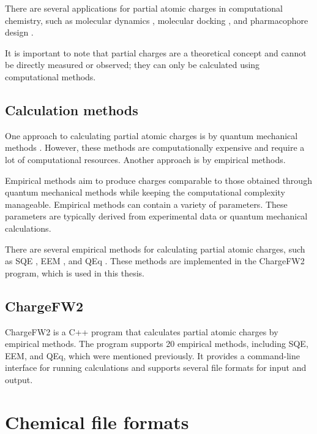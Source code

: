 \documentclass[
  digital,     %
  oneside,     %
  nosansbold,  %
  nocolorbold, %
  lof,         %
  lot,         %
]{fithesis4}
\begin{document}

There are several applications for partial atomic charges in computational chemistry, such as molecular dynamics \cite{nejad2018insulin}, molecular docking \cite{docking}, and pharmacophore design \cite{stalke2011meaningful}. \cite{racek2022thesis,schindler2021thesis}

It is important to note that partial charges are a theoretical concept and cannot be directly measured or observed; they can only be calculated using computational methods. \cite{schindler2019thesis} 

\subsection{Calculation methods}
\label{section:calculating_partial_atomic_charges}

One approach to calculating partial atomic charges is by quantum mechanical methods \cite{gupta2015principles}. However, these methods are computationally expensive and require a lot of computational resources. Another approach is by empirical methods.

Empirical methods aim to produce charges comparable to those obtained through quantum mechanical methods while keeping the computational complexity manageable. Empirical methods can contain a variety of parameters. These parameters are typically derived from experimental data or quantum mechanical calculations. \cite{racek2022thesis}

There are several empirical methods for calculating partial atomic charges, such as SQE \cite{nistor2006generalization}, EEM \cite{mortier1986electronegativity}, and QEq \cite{rappe1991charge}. These methods are implemented in the ChargeFW2 \cite{racek2020acc2} program, which is used in this thesis.

\subsection{ChargeFW2}
\label{section:chargfw2}

ChargeFW2 is a C++ program that calculates partial atomic charges by empirical methods. The program supports 20 empirical methods, including SQE, EEM, and QEq, which were mentioned previously. It provides a command-line interface for running calculations and supports several file formats for input and output. \cite{racek2020acc2}

\section{Chemical file formats}
\label{section:chemical_file_formats}
\end{document}
